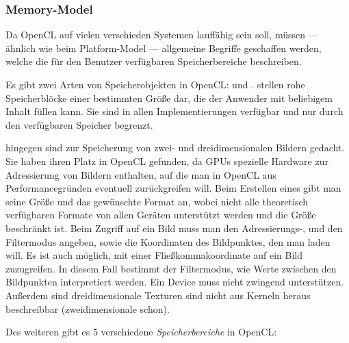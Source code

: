 \subsubsection{Memory-Model}
\label{sec:opencl_memory_model}

Da OpenCL auf vielen verschieden Systemen lauffähig sein soll, müssen
--- ähnlich wie beim Platform-Model --- allgemeine Begriffe geschaffen
werden, welche die für den Benutzer verfügbaren Speicherbereiche
beschreiben.

Es gibt zwei Arten von Speicherobjekten in OpenCL\@:
 und
.  stellen rohe
Speicherblöcke einer bestimmten Größe dar, die der Anwender mit
beliebigem Inhalt füllen kann. Sie sind in allen Implementierungen
verfügbar und nur durch den verfügbaren Speicher begrenzt.

 hingegen sind zur Speicherung von zwei- und
dreidimensionalen Bildern gedacht. Sie haben ihren Platz in OpenCL
gefunden, da GPUs spezielle Hardware zur Adressierung von Bildern
enthalten, auf die man in OpenCL aus Performancegründen eventuell
zurückgreifen will. Beim Erstellen eines  gibt man seine
Größe und das gewünschte Format an, wobei nicht alle theoretisch
verfügbaren Formate von allen Geräten unterstützt werden und die Größe
beschränkt ist. Beim Zugriff auf ein Bild muss man den Adressierungs-,
und den Filtermodus angeben, sowie die Koordinaten des Bildpunktes,
den man laden will. Es ist auch möglich, mit einer
Fließkommakoordinate auf ein Bild zuzugreifen. In diesem Fall bestimmt
der Filtermodus, wie Werte zwischen den Bildpunkten interpretiert
werden. Ein Device muss nicht zwingend 
unterstützen. Außerdem sind dreidimensionale Texturen sind nicht aus
Kerneln heraus beschreibbar (zweidimensionale schon).

Des weiteren gibt es 5 verschiedene \emph{Speicherbereiche} in OpenCL\@:

